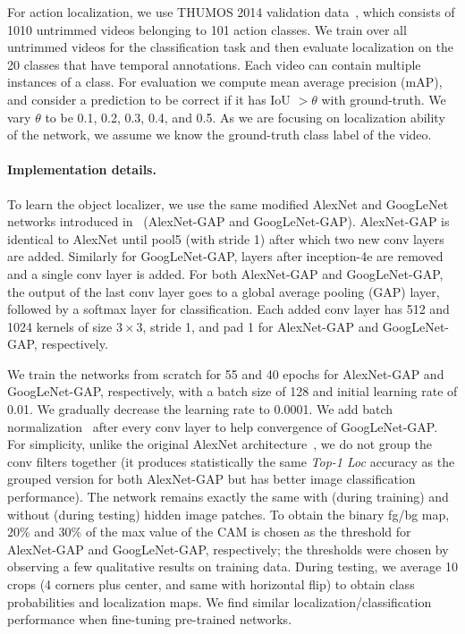 \documentclass[10pt,twocolumn,letterpaper]{article}
\begin{document}
For action localization, we use THUMOS 2014 validation data~\cite{jiang-14}, which consists of 1010 untrimmed videos belonging to 101 action classes. We train over all untrimmed videos for the classification task and then evaluate localization on the 20 classes that have temporal annotations. Each video can contain multiple instances of a class. For evaluation we compute mean average precision (mAP), and consider a prediction to be correct if it has IoU $> \theta$ with ground-truth. We vary $\theta$ to be 0.1, 0.2, 0.3, 0.4, and 0.5. As we are focusing on localization ability of the network, we assume we know the ground-truth class label of the video.

\vspace{-10pt}\paragraph{Implementation details.} To learn the object localizer, we use the same modified AlexNet and GoogLeNet networks introduced in~\cite{zhou-cvpr2016} (AlexNet-GAP and  GoogLeNet-GAP).  AlexNet-GAP is identical to AlexNet until pool5 (with stride 1) after which two new conv layers are added.  Similarly for GoogLeNet-GAP, layers after inception-4e are removed and a single conv layer is added.  For both AlexNet-GAP and GoogLeNet-GAP, the output of the last conv layer goes to a global average pooling (GAP) layer, followed by a softmax layer for classification.  Each added conv layer has 512 and 1024 kernels of size $3 \times 3$, stride 1, and pad 1 for AlexNet-GAP and  GoogLeNet-GAP, respectively. 

We train the networks from scratch for 55 and 40 epochs for AlexNet-GAP and GoogLeNet-GAP, respectively, with a batch size of 128 and initial learning rate of 0.01. We gradually decrease the learning rate to 0.0001.  We add batch normalization~\cite{bn} after every conv layer to help convergence of GoogLeNet-GAP. For simplicity, unlike the original AlexNet architecture~\cite{krizhevsky-nips2012}, we do not group the conv filters together (it produces statistically the same \emph{Top-1 Loc} accuracy as the grouped version for both AlexNet-GAP but has better image classification performance). The network remains exactly the same with (during training) and without (during testing) hidden image patches. To obtain the binary fg/bg map, $20\%$ and $30\%$ of the max value of the CAM is chosen as the threshold for AlexNet-GAP and GoogLeNet-GAP, respectively; the thresholds were chosen by observing a few qualitative results on training data.  During testing, we average 10 crops (4 corners plus center, and same with horizontal flip) to obtain class probabilities and localization maps.  We find similar localization/classification performance when fine-tuning pre-trained networks.
\end{document}
